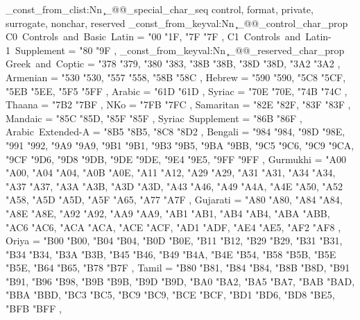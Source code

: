 \seq_const_from_clist:Nn \c_@@_special_char_seq
  { control, format, private, surrogate, nonchar, reserved }
\prop_const_from_keyval:Nn \c_@@_control_char_prop
  {
    C0~Controls~and~Basic~Latin        = { {"00} {"1F}, {"7F} {"7F} },
    C1~Controls~and~Latin-1~Supplement = { {"80} {"9F} },
  }
\prop_const_from_keyval:Nn \c_@@_reserved_char_prop
  {
    Greek~and~Coptic                               = { {"378} {"379}, {"380} {"383}, {"38B} {"38B}, {"38D} {"38D}, {"3A2} {"3A2} },
    Armenian                                       = { {"530} {"530}, {"557} {"558}, {"58B} {"58C} },
    Hebrew                                         = { {"590} {"590}, {"5C8} {"5CF}, {"5EB} {"5EE}, {"5F5} {"5FF} },
    Arabic                                         = { {"61D} {"61D} },
    Syriac                                         = { {"70E} {"70E}, {"74B} {"74C} },
    Thaana                                         = { {"7B2} {"7BF} },
    NKo                                            = { {"7FB} {"7FC} },
    Samaritan                                      = { {"82E} {"82F}, {"83F} {"83F} },
    Mandaic                                        = { {"85C} {"85D}, {"85F} {"85F} },
    Syriac~Supplement                              = { {"86B} {"86F} },
    Arabic~Extended-A                              = { {"8B5} {"8B5}, {"8C8} {"8D2} },
    Bengali                                        = { {"984} {"984}, {"98D} {"98E}, {"991} {"992}, {"9A9} {"9A9}, {"9B1} {"9B1}, {"9B3} {"9B5}, {"9BA} {"9BB}, {"9C5} {"9C6}, {"9C9} {"9CA}, {"9CF} {"9D6}, {"9D8} {"9DB}, {"9DE} {"9DE}, {"9E4} {"9E5}, {"9FF} {"9FF} },
    Gurmukhi                                       = { {"A00} {"A00}, {"A04} {"A04}, {"A0B} {"A0E}, {"A11} {"A12}, {"A29} {"A29}, {"A31} {"A31}, {"A34} {"A34}, {"A37} {"A37}, {"A3A} {"A3B}, {"A3D} {"A3D}, {"A43} {"A46}, {"A49} {"A4A}, {"A4E} {"A50}, {"A52} {"A58}, {"A5D} {"A5D}, {"A5F} {"A65}, {"A77} {"A7F} },
    Gujarati                                       = { {"A80} {"A80}, {"A84} {"A84}, {"A8E} {"A8E}, {"A92} {"A92}, {"AA9} {"AA9}, {"AB1} {"AB1}, {"AB4} {"AB4}, {"ABA} {"ABB}, {"AC6} {"AC6}, {"ACA} {"ACA}, {"ACE} {"ACF}, {"AD1} {"ADF}, {"AE4} {"AE5}, {"AF2} {"AF8} },
    Oriya                                          = { {"B00} {"B00}, {"B04} {"B04}, {"B0D} {"B0E}, {"B11} {"B12}, {"B29} {"B29}, {"B31} {"B31}, {"B34} {"B34}, {"B3A} {"B3B}, {"B45} {"B46}, {"B49} {"B4A}, {"B4E} {"B54}, {"B58} {"B5B}, {"B5E} {"B5E}, {"B64} {"B65}, {"B78} {"B7F} },
    Tamil                                          = { {"B80} {"B81}, {"B84} {"B84}, {"B8B} {"B8D}, {"B91} {"B91}, {"B96} {"B98}, {"B9B} {"B9B}, {"B9D} {"B9D}, {"BA0} {"BA2}, {"BA5} {"BA7}, {"BAB} {"BAD}, {"BBA} {"BBD}, {"BC3} {"BC5}, {"BC9} {"BC9}, {"BCE} {"BCF}, {"BD1} {"BD6}, {"BD8} {"BE5}, {"BFB} {"BFF} },
}
